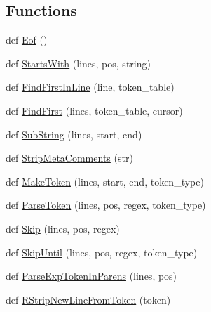 \subsection*{Functions}
\begin{DoxyCompactItemize}
\item 
def \mbox{\hyperlink{namespacegoogletest-master_1_1googletest_1_1scripts_1_1pump_a6a528a6e3710885d16d33bbbe9ee45b8}{Eof}} ()
\item 
def \mbox{\hyperlink{namespacegoogletest-master_1_1googletest_1_1scripts_1_1pump_a2814ca5ce847fc4e41730d81c0fd6683}{Starts\+With}} (lines, pos, string)
\item 
def \mbox{\hyperlink{namespacegoogletest-master_1_1googletest_1_1scripts_1_1pump_af8f0f5a0e136ebd1947b1d583aadc319}{Find\+First\+In\+Line}} (line, token\+\_\+table)
\item 
def \mbox{\hyperlink{namespacegoogletest-master_1_1googletest_1_1scripts_1_1pump_a2830a0e2b98580528299da5d83efe04e}{Find\+First}} (lines, token\+\_\+table, cursor)
\item 
def \mbox{\hyperlink{namespacegoogletest-master_1_1googletest_1_1scripts_1_1pump_a340fe1bba7ee6be6192dd247c5a47473}{Sub\+String}} (lines, start, end)
\item 
def \mbox{\hyperlink{namespacegoogletest-master_1_1googletest_1_1scripts_1_1pump_a2b0690099ba16ba15b6528cb42022f88}{Strip\+Meta\+Comments}} (str)
\item 
def \mbox{\hyperlink{namespacegoogletest-master_1_1googletest_1_1scripts_1_1pump_a28c5e8ae08f5f6a09248e5540755037b}{Make\+Token}} (lines, start, end, token\+\_\+type)
\item 
def \mbox{\hyperlink{namespacegoogletest-master_1_1googletest_1_1scripts_1_1pump_af5d3c06f48dc1fb836a60acc09fd30c6}{Parse\+Token}} (lines, pos, regex, token\+\_\+type)
\item 
def \mbox{\hyperlink{namespacegoogletest-master_1_1googletest_1_1scripts_1_1pump_abce210f0a086e71814024fc85998d37a}{Skip}} (lines, pos, regex)
\item 
def \mbox{\hyperlink{namespacegoogletest-master_1_1googletest_1_1scripts_1_1pump_a64e3cd351d9386eec385aa0d6fad39e6}{Skip\+Until}} (lines, pos, regex, token\+\_\+type)
\item 
def \mbox{\hyperlink{namespacegoogletest-master_1_1googletest_1_1scripts_1_1pump_a537d516093b78508be7e497a030bdb44}{Parse\+Exp\+Token\+In\+Parens}} (lines, pos)
\item 
def \mbox{\hyperlink{namespacegoogletest-master_1_1googletest_1_1scripts_1_1pump_ac003d26c66373025f3fed310d3767ee6}{R\+Strip\+New\+Line\+From\+Token}} (token)

\end{DoxyCompactItemize}
